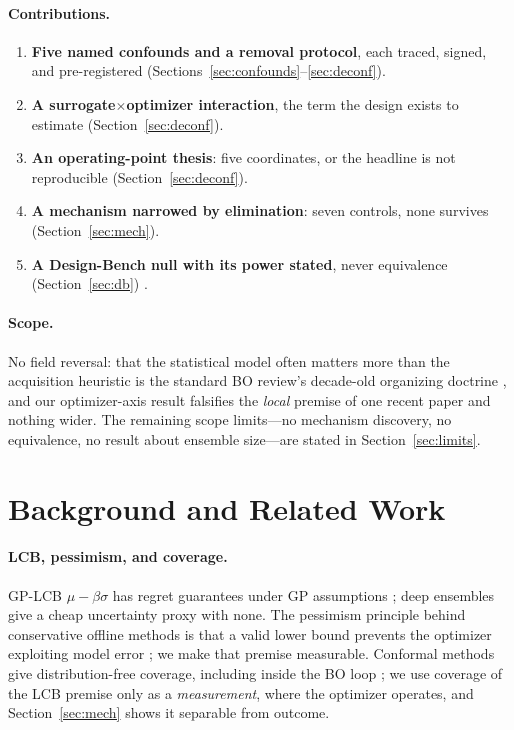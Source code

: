 \documentclass[letterpaper]{article} %
\theoremstyle{plain}
\newcommand{\mdemph}[1]{\emph{#1}}
\begin{document}
\paragraph{Contributions.}
\begin{enumerate}
\item \textbf{Five named confounds and a removal protocol}, each traced, signed, and pre-registered (Sections~\ref{sec:confounds}--\ref{sec:deconf}).
\item \textbf{A surrogate$\times$optimizer interaction}, the term the design exists to estimate (Section~\ref{sec:deconf}).
\item \textbf{An operating-point thesis}: five coordinates, or the headline is not reproducible (Section~\ref{sec:deconf}).
\item \textbf{A mechanism narrowed by elimination}: seven controls, none survives (Section~\ref{sec:mech}).
\item \textbf{A Design-Bench null with its power stated}, never equivalence (Section~\ref{sec:db}) \citep{agarwal2021precipice}.
\end{enumerate}

\paragraph{Scope.} No field reversal: that the statistical model often matters more than the acquisition heuristic is the standard BO review's decade-old organizing doctrine \citep{shahriari2016humanoutoftheloop}, and our optimizer-axis result falsifies the \mdemph{local} premise of one recent paper \citep{chemingui2024pggs} and nothing wider. The remaining scope limits---no mechanism discovery, no equivalence, no result about ensemble size---are stated in Section~\ref{sec:limits}.

\section{Background and Related Work}

\paragraph{LCB, pessimism, and coverage.} GP-LCB $\mu-\beta\sigma$ has regret guarantees under GP assumptions \citep{srinivas2010ucb}; deep ensembles \citep{lakshminarayanan2017ensembles} give a cheap uncertainty proxy with none. The pessimism principle behind conservative offline methods is that a valid lower bound prevents the optimizer exploiting model error \citep{jin2021pessimism}; we make that premise measurable. Conformal methods give distribution-free coverage, including inside the BO loop \citep{angelopoulos2023conformal,stanton2023conformalbo}; we use coverage of the LCB premise only as a \mdemph{measurement}, where the optimizer operates, and Section~\ref{sec:mech} shows it separable from outcome.
\end{document}
